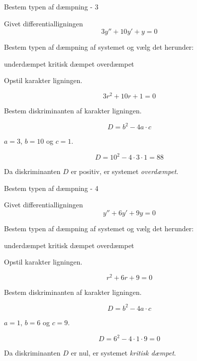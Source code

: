 \documentclass{article}
\begin{document}
\begin{exercise}{Bestem typen af dæmpning - 3}

Givet differentialligningen
\[
3 y'' + 10 y' + y = 0
\]

Bestem typen af dæmpning af systemet og vælg det herunder:
\begin{multichoice}
\itemfalse underdæmpet
\itemfalse kritisk dæmpet
\itemtrue overdæmpet
\end{multichoice}


\hint
Opstil karakter ligningen.

\hint
\[
3r^2 + 10r + 1 = 0
\]

\hint
Bestem diskriminanten af karakter ligningen.

\hint
\[
D = b^2 - 4 a \cdot c
\]

\hint
$a = 3$, $b = 10$ og $c = 1$.

\hint
\[
D = 10^2 - 4 \cdot 3 \cdot 1 = 88
\]

\hint
Da diskriminanten $D$ er positiv, er systemet \emph{overdæmpet}.

\end{exercise}

\newpage

\begin{exercise}{Bestem typen af dæmpning - 4}

Givet differentialligningen
\[
y'' + 6y' + 9y = 0
\]

Bestem typen af dæmpning af systemet og vælg det herunder:
\begin{multichoice}
\itemfalse underdæmpet
\itemtrue kritisk dæmpet
\itemfalse overdæmpet
\end{multichoice}


\hint
Opstil karakter ligningen.

\hint
\[
r^2 + 6r + 9 = 0
\]

\hint
Bestem diskriminanten af karakter ligningen.

\hint
\[
D = b^2 - 4 a \cdot c
\]

\hint
$a = 1$, $b = 6$ og $c = 9$.

\hint
\[
D = 6^2 - 4 \cdot 1 \cdot 9 = 0
\]

\hint
Da diskriminanten $D$ er nul, er systemet \emph{kritisk dæmpet}.

\end{exercise}

\newpage
\end{document}
